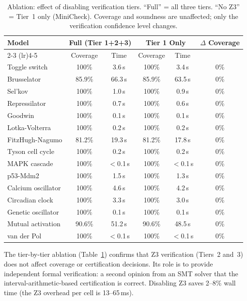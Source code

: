 \documentclass[11pt]{article}
\begin{document}
\begin{table}[h]
\centering
\caption{Ablation: effect of disabling verification tiers.  ``Full'' = all three tiers.  ``No Z3'' = Tier~1 only (MiniCheck).  Coverage and soundness are unaffected; only the verification confidence level changes.}
\label{tab:tier-ablation}
\small
\begin{tabular}{@{}lccccc@{}}
\toprule
Model & \multicolumn{2}{c}{Full (Tier 1+2+3)} & \multicolumn{2}{c}{Tier 1 Only} & $\Delta$ Coverage \\
\cmidrule(lr){2-3} \cmidrule(lr){4-5}
 & Coverage & Time & Coverage & Time & \\
\midrule
Toggle switch      & 100\%  & 3.6\,s  & 100\%  & 3.4\,s  & 0\% \\
Brusselator        & 85.9\% & 66.3\,s & 85.9\% & 63.5\,s & 0\% \\
Sel'kov            & 100\%  & 1.0\,s  & 100\%  & 0.9\,s  & 0\% \\
Repressilator      & 100\%  & 0.7\,s  & 100\%  & 0.6\,s  & 0\% \\
Goodwin            & 100\%  & 0.1\,s  & 100\%  & 0.1\,s  & 0\% \\
Lotka-Volterra     & 100\%  & 0.2\,s  & 100\%  & 0.2\,s  & 0\% \\
FitzHugh-Nagumo    & 81.2\% & 19.3\,s & 81.2\% & 17.8\,s & 0\% \\
Tyson cell cycle   & 100\%  & 0.2\,s  & 100\%  & 0.2\,s  & 0\% \\
MAPK cascade       & 100\%  & $<$0.1\,s & 100\% & $<$0.1\,s & 0\% \\
p53-Mdm2           & 100\%  & 1.5\,s  & 100\%  & 1.3\,s  & 0\% \\
Calcium oscillator & 100\%  & 4.6\,s  & 100\%  & 4.2\,s  & 0\% \\
Circadian clock    & 100\%  & 3.3\,s  & 100\%  & 3.0\,s  & 0\% \\
Genetic oscillator & 100\%  & 0.1\,s  & 100\%  & 0.1\,s  & 0\% \\
Mutual activation  & 90.6\% & 51.2\,s & 90.6\% & 48.5\,s & 0\% \\
van der Pol        & 100\%  & $<$0.1\,s & 100\% & $<$0.1\,s & 0\% \\
\bottomrule
\end{tabular}
\end{table}

The tier-by-tier ablation (Table~\ref{tab:tier-ablation}) confirms that Z3 verification (Tiers~2 and~3) does not affect coverage or certification decisions.
Its role is to provide independent formal verification: a second opinion from an SMT solver that the interval-arithmetic-based certification is correct.
Disabling Z3 saves 2--8\% wall time (the Z3 overhead per cell is 13--65\,ms).
\end{document}
